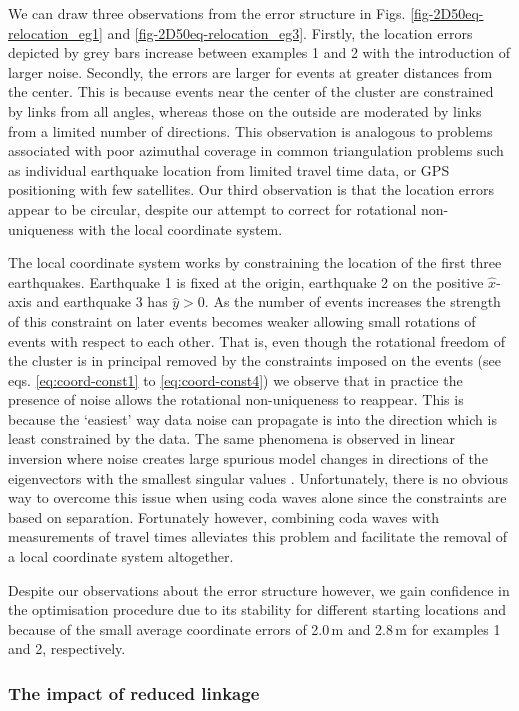 \documentclass[extra]{gji}
\begin{document}
We can draw three observations from the error structure in Figs.
\ref{fig-2D50eq-relocation_eg1} and \ref{fig-2D50eq-relocation_eg3}.
Firstly, the location errors depicted by grey bars increase between
examples 1 and 2 with the introduction of larger noise. Secondly,
the errors are larger for events at greater distances from the
center. This is because events near the center of the cluster are
constrained by links from all angles, whereas those on the outside
are moderated by links from a limited number of directions. This
observation is analogous to problems associated with poor azimuthal
coverage in common triangulation problems such as individual
earthquake location from limited travel time data, or GPS
positioning with few satellites. Our third observation is that the
location errors appear to be circular, despite our attempt to
correct for rotational non-uniqueness with the local coordinate
system.

The local coordinate system works by constraining the location of
the first three earthquakes. Earthquake 1 is fixed at the origin,
earthquake 2 on the positive $\hat{x}$-axis and earthquake 3 has
$\hat{y}>0$. As the number of events increases the strength of this
constraint on later events becomes weaker allowing small rotations
of events with respect to each other. That is, even though the
rotational freedom of the cluster is in principal removed by the
constraints imposed on the events (see eqs. \ref{eq:coord-const1} to
\ref {eq:coord-const4}) we observe that in practice the presence of
noise allows the rotational non-uniqueness to reappear. This is
because the `easiest' way data noise can propagate is into the
direction which is least constrained by the data. The same phenomena
is observed in linear inversion where noise creates large spurious
model changes in directions of the eigenvectors with the smallest
singular values \citep[e.g ][]{dr_Aster05a}. Unfortunately, there is
no obvious way to overcome this issue when using coda waves alone
since the constraints are based on separation. Fortunately however,
combining coda waves with measurements of travel times alleviates
this problem and facilitate the removal of a local coordinate system
altogether.

Despite our observations about the error structure however, we gain
confidence in the optimisation procedure due to its stability for
different starting locations and because of the small average
coordinate errors of 2.0\,m and 2.8\,m for examples 1 and 2,
respectively.

\subsubsection{The impact of reduced linkage}
\end{document}
